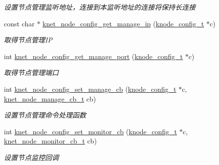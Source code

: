 \begin{DoxyCompactItemize}
\begin{DoxyCompactList}\small\item\em 设置节点管理监听地址，连接到本监听地址的连接将保持长连接 \end{DoxyCompactList}\item 
const char $\ast$ \hyperlink{a00104_a985f7a44724e41240b9ae33e44f52eb7_a985f7a44724e41240b9ae33e44f52eb7}{knet\+\_\+node\+\_\+config\+\_\+get\+\_\+manage\+\_\+ip} (\hyperlink{a00066_af1cfaee0eb1c76ebf06076b95cc47ee1_af1cfaee0eb1c76ebf06076b95cc47ee1}{knode\+\_\+config\+\_\+t} $\ast$c)
\begin{DoxyCompactList}\small\item\em 取得节点管理\+I\+P \end{DoxyCompactList}\item 
int \hyperlink{a00104_a64c20eeea8d7ccbe8cd9a31211caddc6_a64c20eeea8d7ccbe8cd9a31211caddc6}{knet\+\_\+node\+\_\+config\+\_\+get\+\_\+manage\+\_\+port} (\hyperlink{a00066_af1cfaee0eb1c76ebf06076b95cc47ee1_af1cfaee0eb1c76ebf06076b95cc47ee1}{knode\+\_\+config\+\_\+t} $\ast$c)
\begin{DoxyCompactList}\small\item\em 取得节点管理端口 \end{DoxyCompactList}\item 
int \hyperlink{a00104_aa82ac1ed089ff25d2b1c45393013bebe_aa82ac1ed089ff25d2b1c45393013bebe}{knet\+\_\+node\+\_\+config\+\_\+set\+\_\+manage\+\_\+cb} (\hyperlink{a00066_af1cfaee0eb1c76ebf06076b95cc47ee1_af1cfaee0eb1c76ebf06076b95cc47ee1}{knode\+\_\+config\+\_\+t} $\ast$c, \hyperlink{a00066_acd4bad75f444cb56dffa5f9413bbe456_acd4bad75f444cb56dffa5f9413bbe456}{knet\+\_\+node\+\_\+manage\+\_\+cb\+\_\+t} cb)
\begin{DoxyCompactList}\small\item\em 设置节点管理命令处理函数 \end{DoxyCompactList}\item 
int \hyperlink{a00104_a65292f1c4174dbd6c6366411a5b5fb3c_a65292f1c4174dbd6c6366411a5b5fb3c}{knet\+\_\+node\+\_\+config\+\_\+set\+\_\+monitor\+\_\+cb} (\hyperlink{a00066_af1cfaee0eb1c76ebf06076b95cc47ee1_af1cfaee0eb1c76ebf06076b95cc47ee1}{knode\+\_\+config\+\_\+t} $\ast$c, \hyperlink{a00066_aabd13837697aceb20b2a2cb8908e79cd_aabd13837697aceb20b2a2cb8908e79cd}{knet\+\_\+node\+\_\+monitor\+\_\+cb\+\_\+t} cb)
\begin{DoxyCompactList}\small\item\em 设置节点监控回调 \end{DoxyCompactList}\item 

\end{DoxyCompactItemize}

